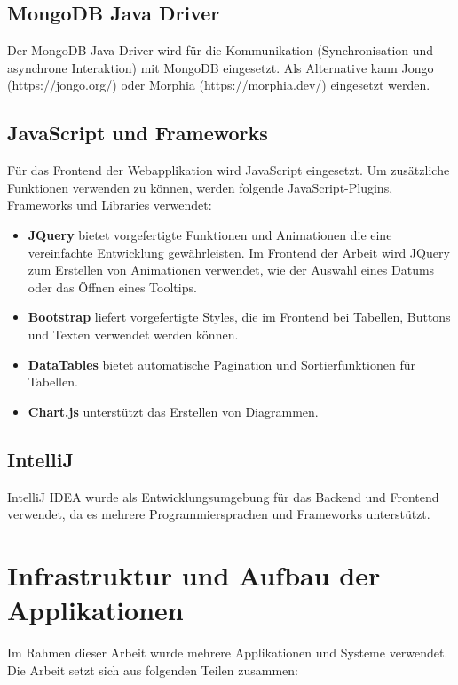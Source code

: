 \subsection{MongoDB Java Driver}
Der MongoDB Java Driver wird für die Kommunikation (Synchronisation und asynchrone Interaktion) mit MongoDB eingesetzt. Als Alternative kann Jongo (https://jongo.org/) oder  Morphia (https://morphia.dev/) eingesetzt werden. 

\subsection{JavaScript und Frameworks}
Für das Frontend der Webapplikation wird JavaScript eingesetzt. Um zusätzliche Funktionen verwenden zu können, werden folgende JavaScript-Plugins, Frameworks und Libraries verwendet: 
\begin{itemize}
\item \textbf{JQuery} bietet vorgefertigte Funktionen und Animationen die eine vereinfachte Entwicklung gewährleisten. Im Frontend der Arbeit wird JQuery zum Erstellen von Animationen verwendet, wie der Auswahl eines Datums oder das Öffnen eines Tooltips.
\item \textbf{Bootstrap} liefert vorgefertigte Styles, die im Frontend bei Tabellen, Buttons und Texten verwendet werden können.
\item \textbf{DataTables} bietet automatische Pagination und Sortierfunktionen für Tabellen.
\item \textbf{Chart.js} unterstützt das Erstellen von Diagrammen. 
\end{itemize}

\subsection{IntelliJ}
IntelliJ IDEA wurde als Entwicklungsumgebung für das Backend und Frontend verwendet, da es mehrere Programmiersprachen und Frameworks unterstützt.

\section{Infrastruktur und Aufbau der Applikationen} 
Im Rahmen dieser Arbeit wurde mehrere Applikationen und Systeme verwendet. Die Arbeit setzt sich aus folgenden Teilen zusammen:

